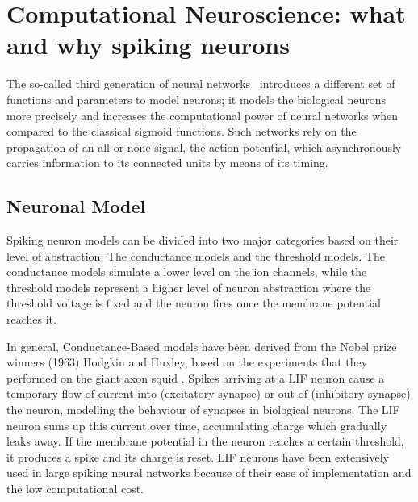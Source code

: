 %

\section{Computational Neuroscience: what and why spiking neurons}
\label{sec:comp}

The so-called third generation of neural networks~\cite{maass1997networks} introduces a different set of functions and parameters to model neurons;
it models the biological neurons more precisely and increases the computational power of neural networks when compared to the classical sigmoid functions.
Such networks rely on the propagation of an all-or-none signal, the action potential, which asynchronously carries information to its connected units by means of its timing.
\subsection{Neuronal Model}
Spiking neuron models can be divided into two major categories \cite{gernstbook} based on their level of abstraction: The conductance models and the threshold models.
The conductance models simulate a lower level on the ion channels, while the threshold models represent a higher level of neuron abstraction where the threshold voltage is fixed and the neuron fires once the membrane potential reaches it.

In general, Conductance-Based models have been derived from the Nobel prize winners (1963) Hodgkin and Huxley, based on the experiments that they performed on the giant axon squid \cite{hhmodel}.
Spikes arriving at a LIF neuron cause a temporary flow of current into (excitatory synapse) or out of (inhibitory synapse) the neuron, modelling the behaviour of synapses in biological neurons.
The LIF neuron sums up this current over time, accumulating charge which gradually leaks away.
If the membrane potential in the neuron reaches a certain threshold, it produces a spike and its charge is reset.
LIF neurons have been extensively used in large spiking neural networks \cite{Delorme1999989} because of their ease of implementation and the low computational cost.

